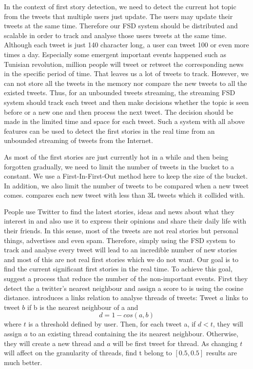 \documentclass[a4paper,12pt]{article}
\begin{document}
In the context of first story detection, we need to detect the current hot topic from the tweets that multiple users just update. The users may update their tweets at the same time. Therefore our FSD system should be distributed and scalable in order to track and analyse those users tweets at the same time. Although each tweet is just 140 character long, a user can tweet 100 or even more times a day. Especially some emergent important events happened such as Tunisian revolution, million people will tweet or retweet the corresponding news in the specific period of time. That leaves us a lot of tweets to track. However, we can not store all the tweets in the memory nor compare the new tweets to all the existed tweets. Thus, for an unbounded tweets streaming, the streaming FSD system should track each tweet and then make decisions whether the topic is seen before or a new one and then process the next tweet. The decision should be made in the limited time and space for each tweet. Such a system with all above features can be used to detect the first stories in the real time from an unbounded streaming of tweets from the Internet. \newline



As most of the first stories are just currently hot in a while and then being forgotten gradually, we need to limit the number of tweets in the bucket to a constant. We use a First-In-First-Out method here to keep the size of the bucket. In addition, we also limit the number of tweets to be compared when a new tweet comes. \citep{Petrovic:2010} compares each new tweet with less than 3L tweets which it collided with. \newline

People use Twitter to find the latest stories, ideas and news about what they interest in and also use it to express their opinions and share their daily life with their friends. In this sense, most of the tweets are not real stories but personal things, advertises and even spam. Therefore, simply using the FSD system to track and analyse every tweet will lead to an incredible number of new stories and most of this are not real first stories which we do not want. Our goal is to find the current significant first stories in the real time. To achieve this goal, \citep{Petrovic:2010} suggest a process that reduce the number of the non-important events. First they detect the a twitter’s nearest neighbour and assign a score to is using the cosine distance. \citep{Nallapati:2004:ETW:1031171.1031258} introduces a links relation to analyse threads of tweets: Tweet $a$ links to tweet $b$ if b is the nearest neighbour of a and $$d=1-cos(a,b)$$
where $t$ is a threshold defined by user. Then, for each tweet a, if $d<t$, they will assign $a$ to an existing thread containing the its nearest neighbour. Otherwise, they will create a new thread and $a$ will be first tweet for thread. As changing $t$ will affect on the granularity of threads, \citep{Petrovic:2010} find t belong to $[0.5,0.5]$ results are much better.\newline
\end{document}
